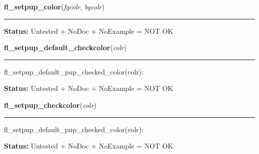     \vspace{0.5ex}

\hspace{.8\funcindent}\begin{boxedminipage}{\funcwidth}

    \raggedright \textbf{fl\_setpup\_color}(\textit{fgcolr}, \textit{bgcolr})

    \vspace{-1.5ex}

    \rule{\textwidth}{0.5\fboxrule}
\setlength{\parskip}{2ex}
\setlength{\parskip}{1ex}
\textbf{Status:} Untested + NoDoc + NoExample = NOT OK



    \end{boxedminipage}

    \label{xformslib:library:fl_setpup_default_pup_checked_color}

    \vspace{0.5ex}

\hspace{.8\funcindent}\begin{boxedminipage}{\funcwidth}

    \raggedright \textbf{fl\_setpup\_default\_checkcolor}(\textit{colr})

    \vspace{-1.5ex}

    \rule{\textwidth}{0.5\fboxrule}
\setlength{\parskip}{2ex}
    fl\_setpup\_default\_pup\_checked\_color(colr):

\setlength{\parskip}{1ex}
\textbf{Status:} Untested + NoDoc + NoExample = NOT OK



    \end{boxedminipage}

    \label{xformslib:library:fl_setpup_default_pup_checked_color}

    \vspace{0.5ex}

\hspace{.8\funcindent}\begin{boxedminipage}{\funcwidth}

    \raggedright \textbf{fl\_setpup\_checkcolor}(\textit{colr})

    \vspace{-1.5ex}

    \rule{\textwidth}{0.5\fboxrule}
\setlength{\parskip}{2ex}
    fl\_setpup\_default\_pup\_checked\_color(colr):

\setlength{\parskip}{1ex}
\textbf{Status:} Untested + NoDoc + NoExample = NOT OK



    \end{boxedminipage}

